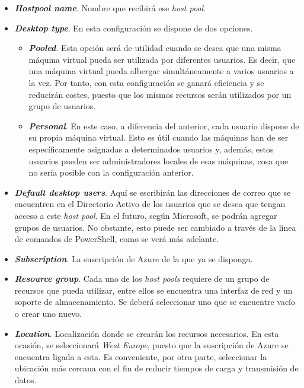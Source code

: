 \begin{itemize}
    \item \textbf{\textit{Hostpool name}}. Nombre que recibirá ese \textit{host pool}.
    
    \item \textbf{\textit{Desktop type}}. En esta configuración se dispone de dos opciones.
    
        \begin{itemize}
            \item \textbf{\textit{Pooled}}. Esta opción será de utilidad cuando se desea que una misma máquina virtual pueda ser utilizada por diferentes usuarios. Es decir, que una máquina virtual pueda albergar simultáneamente a varios usuarios a la vez. Por tanto, con esta configuración se ganará eficiencia y se reducirán costes, puesto que los mismos recursos serán utilizados por un grupo de usuarios.
            
            \item \textbf{\textit{Personal}}. En este caso, a diferencia del anterior, cada usuario dispone de su propia máquina virtual. Esto es útil cuando las máquinas han de ser específicamente asignadas a determinados usuarios y, además, estos usuarios pueden ser administradores locales de esas máquinas, cosa que no sería posible con la configuración anterior.
        \end{itemize}
        
    \item \textbf{\textit{Default desktop users}}. Aquí se escribirán las direcciones de correo que se encuentren en el Directorio Activo de los usuarios que se desea que tengan acceso a este \textit{host pool}. En el futuro, según Microsoft, se podrán agregar grupos de usuarios. No obstante, esto puede ser cambiado a través de la línea de comandos de PowerShell, como se verá más adelante.
    
    \item \textbf{\textit{Subscription}}. La suscripción de Azure de la que ya se disponga.
    
    \item \textbf{\textit{Resource group}}. Cada uno de los \textit{host pools} requiere de un grupo de recursos que pueda utilizar, entre ellos se encuentra una interfaz de red y un soporte de almacenamiento. Se deberá seleccionar uno que se encuentre vacío o crear uno nuevo.
    
    \clearpage
    
    \item \textbf{\textit{Location}}. Localización donde se crearán los recursos necesarios. En esta ocasión, se seleccionará \textit{West Europe}, puesto que la suscripción de Azure se encuentra ligada a esta. Es conveniente, por otra parte, seleccionar la ubicación más cercana con el fin de reducir tiempos de carga y transmisión de datos.
\end{itemize}

